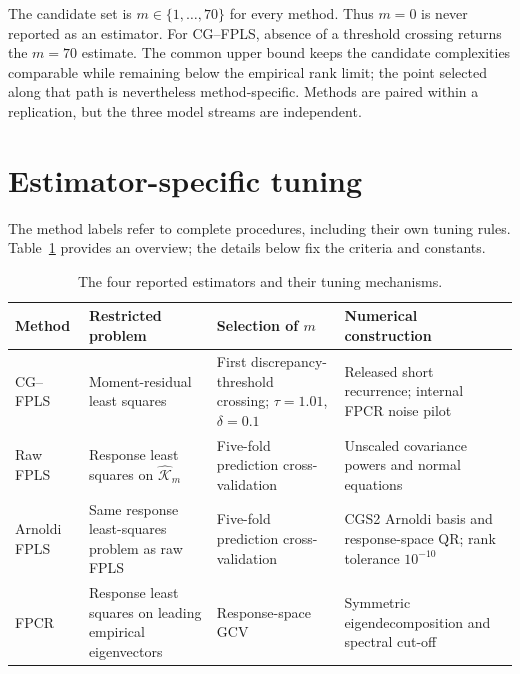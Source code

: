 The candidate set is $m\in\{1,\ldots,70\}$ for every method.  Thus $m=0$ is
never reported as an estimator.  For CG--FPLS, absence of a threshold crossing
returns the $m=70$ estimate.  The common upper bound keeps the candidate
complexities comparable while remaining below the empirical rank limit; the
point selected along that path is nevertheless method-specific.  Methods are
paired within a replication, but the three model streams are independent.

\section{Estimator-specific tuning}
\label{sec:simulation-tuning}

The method labels refer to complete procedures, including their own tuning
rules.  Table~\ref{tab:simulation-method-tuning} provides an overview; the
details below fix the criteria and constants.

\begin{table}[htbp]
    \centering
    \small
    \caption[Estimators and tuning mechanisms]{The four reported estimators and their tuning mechanisms.}
    \label{tab:simulation-method-tuning}
    \begin{tabular}{@{}
        >{\raggedright\arraybackslash}p{2.1cm}
        >{\raggedright\arraybackslash}p{2.6cm}
        >{\raggedright\arraybackslash}p{3.2cm}
        >{\raggedright\arraybackslash}p{3.8cm}@{}}
        \toprule
        Method & Restricted problem & Selection of $m$ & Numerical construction \\
        \midrule
        CG--FPLS
        & Moment-residual least squares
        & First discrepancy-threshold crossing; $\tau=1.01$, $\delta=0.1$
        & Released short recurrence; internal FPCR noise pilot \\

        Raw FPLS
        & Response least squares on $\widehat{\mathcal K}_m$
        & Five-fold prediction cross-validation
        & Unscaled covariance powers and normal equations \\

        Arnoldi FPLS
        & Same response least-squares problem as raw FPLS
        & Five-fold prediction cross-validation
        & CGS2 Arnoldi basis and response-space QR; rank tolerance $10^{-10}$ \\

        FPCR
        & Response least squares on leading empirical eigenvectors
        & Response-space GCV
        & Symmetric eigendecomposition and spectral cut-off \\
        \bottomrule
    \end{tabular}
\end{table}

